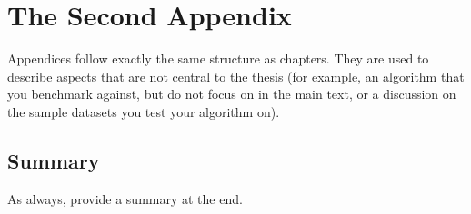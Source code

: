 
\chapter{The Second Appendix}
\label{app:appendix2}


Appendices follow exactly the same structure as chapters. They are used to describe aspects that are not central to the thesis (for example, an algorithm that you benchmark against, but do not focus on in the main text, or a discussion on the sample datasets you test your algorithm on).


\section{Summary}
\label{sec:appendix2:summary}

As always, provide a summary at the end.

